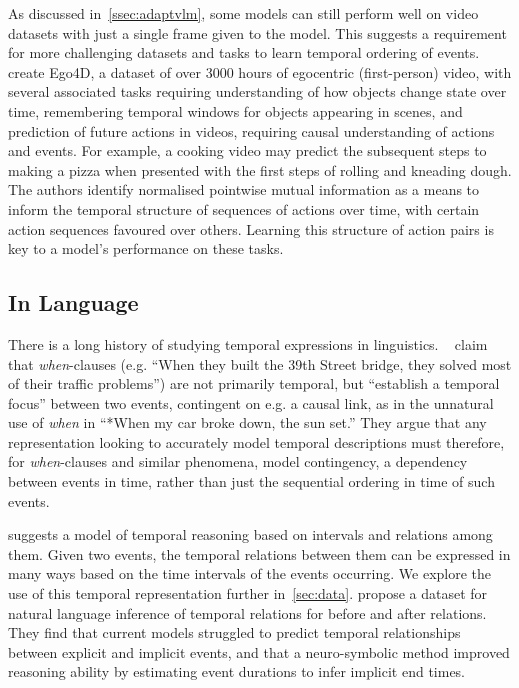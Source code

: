 As discussed in~\cref{ssec:adaptvlm}, some models can still perform well on
video datasets with just a single frame given to the model. This suggests a
requirement for more challenging datasets and tasks to learn temporal ordering
of events. \citet{grauman2022ego4d} create Ego4D, a dataset of over 3000 hours
of egocentric (first-person) video, with several associated tasks requiring
understanding of how objects change state over time, remembering temporal
windows for objects appearing in scenes, and prediction of future actions in
videos, requiring causal understanding of actions and events. For example, a
cooking video may predict the subsequent steps to making a pizza when presented
with the first steps of rolling and kneading dough. The authors identify
normalised pointwise mutual information as a means to inform the temporal
structure of sequences of actions over time, with certain action sequences
favoured over others. Learning this structure of action pairs is key to a
model's performance on these tasks.

\subsection{In Language}
\label{ssec:templang}
There is a long history of studying temporal expressions in linguistics.
~\citet{moens1988temporal} claim that \textit{when}-clauses (e.g. ``When they
built the 39th Street bridge, they solved most of their traffic problems'') are
not primarily temporal, but ``establish a temporal focus'' between two events,
contingent on e.g. a causal link, as in the unnatural use of \textit{when} in
``*When my car broke down, the sun set.''
They argue that any representation looking to accurately model temporal
descriptions must therefore, for \textit{when}-clauses and similar phenomena,
model contingency, a dependency between events in time, rather than just the
sequential ordering in time of such events.

\citet{allen1983interval} suggests a model of temporal reasoning based on
intervals and relations among them. Given two events, the temporal relations
between them can be expressed in many ways based on the time intervals of the
events occurring. We explore the use of this temporal representation further
in~\cref{sec:data}. \citet{zhou2021tracie} propose a dataset for natural
language inference of temporal relations for before and after relations. They
find that current models struggled to predict temporal relationships between
explicit and implicit events, and that a neuro-symbolic method improved 
reasoning ability by estimating event durations to infer implicit end times.

